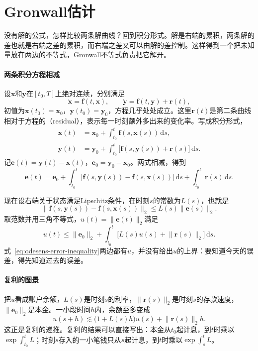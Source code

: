 \section{Gronwall估计}
\label{sec:odesens-gronwall}

没有解的公式，怎样比较两条解曲线？回到积分形式。解是右端的累积，两条解的差也就是右端之差的累积，而右端之差又可以由解的差控制。这样得到一个把未知量放在两边的不等式，Gronwall不等式负责把它解开。

\paragraph{两条积分方程相减}
设$\bm{x}$和$\bm{y}$在$[t_0,T]$上绝对连续，分别满足
\[
 \dot{\bm{x}}=\bm{f}(t,\bm{x}),\qquad
 \dot{\bm{y}}=\bm{f}(t,\bm{y})+\bm{r}(t),
\]
初值为$\bm{x}(t_0)=\bm{x}_0$，$\bm{y}(t_0)=\bm{y}_0$，方程几乎处处成立。这里$\bm{r}(t)$是第二条曲线相对于方程的（residual），表示每一时刻额外多出来的变化率。写成积分形式，
\[
 \begin{aligned}
 \bm{x}(t)&=\bm{x}_0+\int_{t_0}^{t}\bm{f}(s,\bm{x}(s))\,\mathrm{d}s,\\
 \bm{y}(t)&=\bm{y}_0+\int_{t_0}^{t}\bigl[\bm{f}(s,\bm{y}(s))+\bm{r}(s)\bigr]\,\mathrm{d}s.
 \end{aligned}
\]
记$\bm{e}(t)=\bm{y}(t)-\bm{x}(t)$，$\bm{e}_0=\bm{y}_0-\bm{x}_0$。两式相减，得到
\[
 \bm{e}(t)=\bm{e}_0+\int_{t_0}^{t}\bigl[\bm{f}(s,\bm{y}(s))-\bm{f}(s,\bm{x}(s))\bigr]\,\mathrm{d}s+\int_{t_0}^{t}\bm{r}(s)\,\mathrm{d}s.
\]

现在设右端关于状态满足Lipschitz条件，在时刻$s$的常数为$L(s)$，也就是
\[
 \lVert\bm{f}(s,\bm{y}(s))-\bm{f}(s,\bm{x}(s))\rVert_2\leq L(s)\lVert\bm{e}(s)\rVert_2.
\]
取范数并用三角不等式，$u(t)=\lVert\bm{e}(t)\rVert_2$满足
\begin{equation}
 u(t)\leq\lVert\bm{e}_0\rVert_2+\int_{t_0}^{t}\bigl[L(s)u(s)+\lVert\bm{r}(s)\rVert_2\bigr]\,\mathrm{d}s.
 \label{eq:odesens-error-inequality}
\end{equation}
式~\eqref{eq:odesens-error-inequality}两边都有$u$，并没有给出$u$的上界：要知道今天的误差，得先知道过去的误差。

\paragraph{复利的图景}
把$u$看成账户余额，$L(s)$是时刻$s$的利率，$\lVert\bm{r}(s)\rVert_2$是时刻$s$的存款速度，$\lVert\bm{e}_0\rVert_2$是本金。一小段时间$h$内，余额至多变成
\[
 u(s+h)\lesssim\bigl(1+L(s)h\bigr)u(s)+\lVert\bm{r}(s)\rVert_2h.
\]
这正是复利的递推。复利的结果可以直接写出：本金从$t_0$起计息，到$t$时乘以$\exp\int_{t_0}^{t}L$；时刻$s$存入的一小笔钱只从$s$起计息，到$t$时乘以$\exp\int_{s}^{t}L$。

